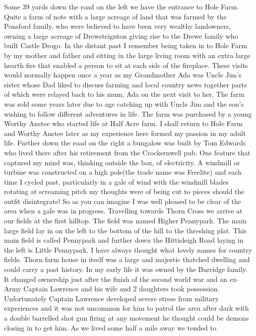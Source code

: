 Some 39 yards down the road on the left we have the entrance to Hole Farm. Quite
a farm of note with a large acreage of land that was farmed by the Ponsford
family, who were believed to have been very wealthy landowners, owning a large
acreage of Drewsteignton giving rise to the Drewe family who built Castle
Drogo. In the distant past I remember being taken in \here to Hole Farm by my mother
and father and sitting in the large living room with an extra large hearth fire
that enabled a person to sit at each side of the fireplace. These visits would
normally happen once a year as my Grandmother Ada was Uncle Jim's sister whose
Dad liked to discuss farming and local country news together parts of which
were relayed back to his mum, Ada on the next visit to her,  The farm was sold
some years later due to age catching up with Uncle Jim and the son's wishing to
follow different adventures in life. The farm was purchased by a young Worthy
Anstee who started life at Half Acre farm. I shall return to Hole Farm and
Worthy Anstee later as my experience here formed my passion in my adult life.
Further down the road on the right a bungalow was built by Tom Edwards who
lived there after his retirement from the Crockernwell pub. One feature that
captured my mind was, thinking outside the box, of electricity. A windmill or
turbine was constructed on a  high pole(the trade name was Freelite) and each
time I cycled past, particularly in a gale of wind with  the windmill blades
rotating at screaming pitch my thoughts were of being cut to pieces should the
outfit disintegrate! So as you can imagine I was well pleased to be clear of
the area when a gale was in progress. Travelling towards Thorn Cross we arrive
at our fields at the first hilltop. The field was named Higher Pennypark. The
main large field lay in on the left to the bottom of the hill to the threshing
plat. This main field is called Pennypark and further down the Hittisleigh Road
laying in the left is Little Pennypark. I have always thought what lovely names
for country fields. Thorn farm house in itself was a large and majestic
thatched dwelling and could carry a past history. In my early life it was owned
by the Burridge family. It changed ownership just after the finish of the
second world war and an ex-Army Captain Lawrence and his wife and 2 daughters
took possession. Unfortunately Captain Lawrence developed severe stress from
military experiences and it was not uncommon for him to patrol the area after
dark with a double barrelled shot gun firing at any movement he thought could
be demons closing in to get him. As we lived some half a mile away we tended to
